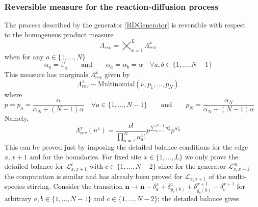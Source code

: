 \documentclass[10pt]{article}
\numberwithin{equation}{section}
\numberwithin{equation}{subsection}
\newcommand{\twoj}{\nu}
\begin{document}
\subsubsection{Reversible measure for the reaction-diffusion process} 
The process described by the generator \eqref{RDGenerator} is reversible with respect to the homogeneus product measure \begin{equation}\label{reversibleMeasureRD}
	\Lambda_{rev}=\bigtimes_{x=1}^{L}\Lambda_{rev}^{x}
\end{equation}
when for any $a\in\{1,\ldots,N\}$
\begin{equation}\label{reversibilityConditionRD}
	\alpha_{a}=\beta_{a}\qquad\text{and}\qquad \alpha_{a}=\alpha_{b}=\alpha \quad \forall a,b\in \{1,\ldots,N-1\}
\end{equation}
This measure has marginals $\Lambda_{rev}^{x}$ given by 
\begin{equation}
	\Lambda^{x}_{rev}\sim \text{Multinomial}\left(\twoj,p_{1},\ldots,p_{N}\right)
\end{equation}
where 
\begin{equation}
	p=p_{a}=\frac{\alpha}{\alpha_{N}+(N-1)\alpha}\quad \forall a\in \{1,\ldots,N-1\}\qquad \text{and}\qquad p_{N}=\frac{\alpha_{N}}{\alpha_{N}+(N-1)\alpha}
\end{equation}
Namely,
\begin{equation}
	\Lambda_{rev}^{x}(n^{x})=\frac{\nu!}{\prod_{a=1}^{N}n_{a}^{x}!}p^{\sum_{a=1}^{N-1}n_{a}^{x}}p^{n_{N}^{x}}
\end{equation}
This can be proved just by imposing the detailed balance conditions for the edge $x,x+1$ and for the boundaries. For fixed site $x\in \{1,\ldots,L\}$ we only prove the detailed balance for  $\mathcal{L}_{x,x+1}^{c}$ with $c\in\{1,\ldots,N-2\}$ since for the generator $\mathcal{L}_{x,x+1}^{m}$ the computation is similar and has already been proved for $\mathcal{L}_{x,x+1}$ of the multi-species stirring. Consider the transition $\bm{n}\to \bm{n}-\delta_{a}^{x}+\delta_{g_{c}(b)}^{x}+\delta_{g_{c}(b)}^{x+1}-\delta_{b}^{x+1}$ for arbitrary $a,b\in\{1,\ldots,N-1\}$ and $c\in\{1,\ldots,N-2\}$; the detailed balance gives
\end{document}
